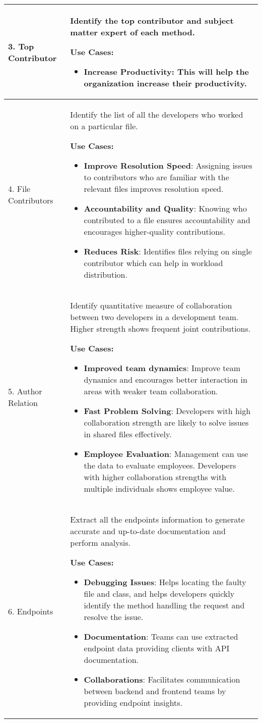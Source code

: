 \begin{longtable}{|m{4cm}|m{10cm}|}
3. Top Contributor & Identify the top contributor and subject matter expert of each method.

\textbf{Use Cases:}
\begin{itemize}
	\item \textbf{Increase Productivity}: This will help the organization increase their productivity.
\end{itemize}
\\ \hline

4. File Contributors & Identify the list of all the developers who worked on a particular file.

\textbf{Use Cases:}
\begin{itemize}
	\item \textbf{Improve Resolution Speed}: Assigning issues to contributors who are familiar
	with the relevant files improves resolution speed. 
	\item \textbf{Accountability and Quality}: Knowing who contributed to a file ensures accountability and encourages higher-quality contributions.
	\item \textbf{Reduces Risk}: Identifies files relying on single contributor which can help in workload distribution.
\end{itemize}
\\ \hline

5. Author Relation & Identify quantitative measure of collaboration between two developers in a development team. Higher strength shows frequent joint contributions.

\textbf{Use Cases:}
\begin{itemize}
	\item \textbf{Improved team dynamics}: Improve team dynamics and encourages better interaction in areas with weaker team collaboration.
	\item \textbf{Fast Problem Solving}: Developers with high collaboration strength are likely to solve issues in shared files effectively.
	\item \textbf{Employee Evaluation}: Management can use the data to evaluate employees. Developers with higher collaboration strengths with multiple individuals shows employee value.
\end{itemize}
\\ \hline

6. Endpoints & Extract all the endpoints information to generate accurate and up-to-date documentation and perform analysis.

\textbf{Use Cases:}
\begin{itemize}
	\item \textbf{Debugging Issues}: Helps locating the faulty file and class, and helps developers quickly identify the method handling the request and resolve the issue.
	\item \textbf{Documentation}: Teams can use extracted endpoint data providing clients with API documentation.
	\item \textbf{Collaborations}: Facilitates communication between backend and frontend teams by providing endpoint insights.
\end{itemize}
\\ \hline


\end{longtable}
